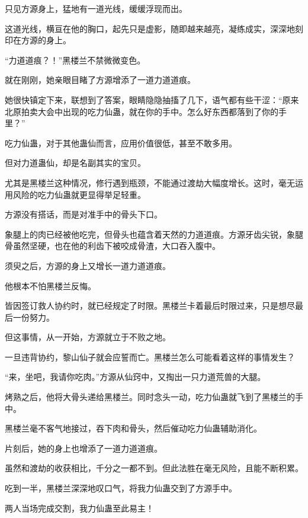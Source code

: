 \begin{this_body}
只见方源身上，猛地有一道光线，缓缓浮现而出。

这道光线，横亘在他的胸口，起先只是虚影，随即越来越亮，凝练成实，深深地刻印在方源的身上。

“力道道痕？！”黑楼兰不禁微微变色。

就在刚刚，她亲眼目睹了方源增添了一道力道道痕。

她很快镇定下来，联想到了答案，眼睛隐隐抽搐了几下，语气都有些干涩：“原来北原拍卖大会中出现的吃力仙蛊，就在你的手中。怎么好东西都落到了你的手里？”

吃力仙蛊，对于其他蛊仙而言，应用价值很低，甚至不敢多用。

但对力道蛊仙，却是名副其实的宝贝。

尤其是黑楼兰这种情况，修行遇到瓶颈，不能通过渡劫大幅度增长。这时，毫无运用风险的吃力仙蛊就更显得举足轻重。

方源没有搭话，而是对准手中的骨头下口。

象腿上的肉已经被他吃完，但骨头也蕴含着天然的力道道痕。方源牙齿尖锐，象腿骨虽然坚硬，也在他的利齿下被咬成骨渣，大口吞入腹中。

须臾之后，方源的身上又增长一道力道道痕。

他根本不怕黑楼兰反悔。

皆因签订救人协约时，就已经规定了时限。黑楼兰卡着最后时限过来，只是想尽最后一份努力。

但这事情，从一开始，方源就立于不败之地。

一旦违背协约，黎山仙子就会应誓而亡。黑楼兰怎么可能看着这样的事情发生？

“来，坐吧，我请你吃肉。”方源从仙窍中，又掏出一只力道荒兽的大腿。

烤熟之后，他将大骨头递给黑楼兰。同时念头一动，吃力仙蛊就飞到了黑楼兰的手中。

黑楼兰毫不客气地接过，吞下肉和骨头，然后催动吃力仙蛊辅助消化。

片刻后，她的身上也增添了一道力道道痕。

虽然和渡劫的收获相比，千分之一都不到。但此法胜在毫无风险，且能不断积累。

吃到一半，黑楼兰深深地叹口气，将我力仙蛊交到了方源手中。

两人当场完成交割，我力仙蛊至此易主！

\end{this_body}

